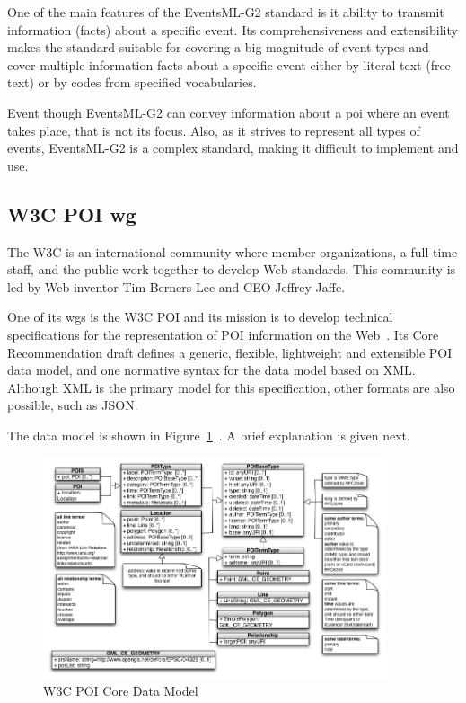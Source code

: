 \documentclass[times]{ettauth}
\begin{document}
One of the main features of the EventsML-G2 standard is it ability to transmit information (facts) about a specific event.
Its comprehensiveness and extensibility makes the standard suitable for covering a big magnitude of event types and cover multiple information facts about a specific event either by literal text (free text) or by codes from specified vocabularies. 

Event though EventsML-G2 can convey information about a \ac{poi} where an event takes place, that is not its focus.
Also, as it strives to represent all types of events, EventsML-G2 is a complex standard, making it difficult to implement and use.

\subsection{\acs{W3C} \acl{POI} \acs{wg}}
\label{section:poi-wg}
The \ac{W3C} is an international community where member organizations, a full-time staff, and the public work together to develop Web standards. 
This community is led by Web inventor Tim Berners-Lee and CEO Jeffrey Jaffe. 

One of its \acp{wg} is the \ac{W3C} \ac{POI} and its mission is to develop technical specifications for the representation of \ac{POI} information on the Web~\cite{w3c-poi}. 
Its Core Recommendation draft defines a generic, flexible, lightweight and extensible \ac{POI} data model, and one normative syntax for the data model based on \acf{XML}.
Although \ac{XML} is the primary model for this specification, other formats are also possible, such as \acf{JSON}.

The data model is shown in Figure~\ref{fig:data-model}~\cite{w3c-poi}.
A brief explanation is given next.

\begin{figure}
\centering
\includegraphics[width=0.9\textwidth]{images/uml}
\caption{W3C POI Core Data Model}
\label{fig:data-model}
\end{figure}
\end{document}
